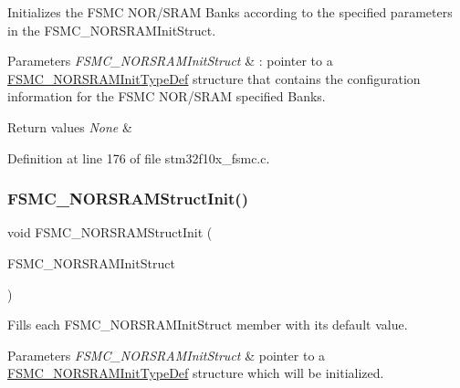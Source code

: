 Initializes the F\+S\+MC N\+O\+R/\+S\+R\+AM Banks according to the specified parameters in the F\+S\+M\+C\+\_\+\+N\+O\+R\+S\+R\+A\+M\+Init\+Struct. 


\begin{DoxyParams}{Parameters}
{\em F\+S\+M\+C\+\_\+\+N\+O\+R\+S\+R\+A\+M\+Init\+Struct} & \+: pointer to a \hyperlink{struct_f_s_m_c___n_o_r_s_r_a_m_init_type_def}{F\+S\+M\+C\+\_\+\+N\+O\+R\+S\+R\+A\+M\+Init\+Type\+Def} structure that contains the configuration information for the F\+S\+MC N\+O\+R/\+S\+R\+AM specified Banks. \\
\hline
\end{DoxyParams}

\begin{DoxyRetVals}{Return values}
{\em None} & \\
\hline
\end{DoxyRetVals}


Definition at line 176 of file stm32f10x\+\_\+fsmc.\+c.

\mbox{\label{group___f_s_m_c___private___functions_gaf33e6dfc34f62d16a0cb416de9e83d28}} 
\subsubsection{\texorpdfstring{F\+S\+M\+C\+\_\+\+N\+O\+R\+S\+R\+A\+M\+Struct\+Init()}{FSMC\_NORSRAMStructInit()}}
{\footnotesize\ttfamily void F\+S\+M\+C\+\_\+\+N\+O\+R\+S\+R\+A\+M\+Struct\+Init (\begin{DoxyParamCaption}\item[{\hyperlink{struct_f_s_m_c___n_o_r_s_r_a_m_init_type_def}{F\+S\+M\+C\+\_\+\+N\+O\+R\+S\+R\+A\+M\+Init\+Type\+Def} $\ast$}]{F\+S\+M\+C\+\_\+\+N\+O\+R\+S\+R\+A\+M\+Init\+Struct }\end{DoxyParamCaption})}



Fills each F\+S\+M\+C\+\_\+\+N\+O\+R\+S\+R\+A\+M\+Init\+Struct member with its default value. 


\begin{DoxyParams}{Parameters}
{\em F\+S\+M\+C\+\_\+\+N\+O\+R\+S\+R\+A\+M\+Init\+Struct} & pointer to a \hyperlink{struct_f_s_m_c___n_o_r_s_r_a_m_init_type_def}{F\+S\+M\+C\+\_\+\+N\+O\+R\+S\+R\+A\+M\+Init\+Type\+Def} structure which will be initialized. \\
\hline
\end{DoxyParams}

